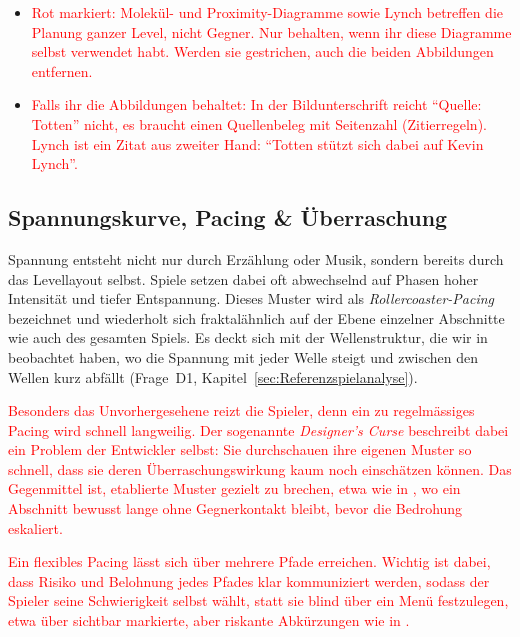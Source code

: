 \documentclass[../Main.tex]{subfiles}
\begin{document}
\begin{itemize}[leftmargin=1.5cm]
    \item \textcolor{red}{Rot markiert: Molekül- und Proximity-Diagramme sowie Lynch betreffen die Planung ganzer Level, nicht Gegner. Nur behalten, wenn ihr diese Diagramme selbst verwendet habt. Werden sie gestrichen, auch die beiden Abbildungen entfernen.}
    \item \textcolor{red}{Falls ihr die Abbildungen behaltet: In der Bildunterschrift reicht \enquote{Quelle: Totten} nicht, es braucht einen Quellenbeleg mit Seitenzahl (Zitierregeln). Lynch ist ein Zitat aus zweiter Hand: \enquote{Totten stützt sich dabei auf Kevin Lynch}.}
\end{itemize}

\subsection{Spannungskurve, Pacing \& Überraschung} \label{sec:Pacing}
Spannung entsteht nicht nur durch Erzählung oder Musik, sondern bereits durch das Levellayout selbst. Spiele setzen dabei oft abwechselnd auf Phasen hoher Intensität und tiefer Entspannung. Dieses Muster wird als \textit{Rollercoaster-Pacing} bezeichnet und wiederholt sich fraktalähnlich auf der Ebene einzelner Abschnitte wie auch des gesamten Spiels.\autocite{gdc_tenprinciples2010} Es deckt sich mit der Wellenstruktur, die wir in  beobachtet haben, wo die Spannung mit jeder Welle steigt und zwischen den Wellen kurz abfällt (Frage~D1, Kapitel~\ref{sec:Referenzspielanalyse}).

\textcolor{red}{Besonders das Unvorhergesehene reizt die Spieler, denn ein zu regelmässiges Pacing wird schnell langweilig. Der sogenannte \textit{Designer's Curse} beschreibt dabei ein Problem der Entwickler selbst: Sie durchschauen ihre eigenen Muster so schnell, dass sie deren Überraschungswirkung kaum noch einschätzen können. Das Gegenmittel ist, etablierte Muster gezielt zu brechen, etwa wie in , wo ein Abschnitt bewusst lange ohne Gegnerkontakt bleibt, bevor die Bedrohung eskaliert.\autocite{gdc_tenprinciples2010}}

\textcolor{red}{Ein flexibles Pacing lässt sich über mehrere Pfade erreichen. Wichtig ist dabei, dass Risiko und Belohnung jedes Pfades klar kommuniziert werden, sodass der Spieler seine Schwierigkeit selbst wählt, statt sie blind über ein Menü festzulegen, etwa über sichtbar markierte, aber riskante Abkürzungen wie in .\autocite{gdc_tenprinciples2010}}
\end{document}
